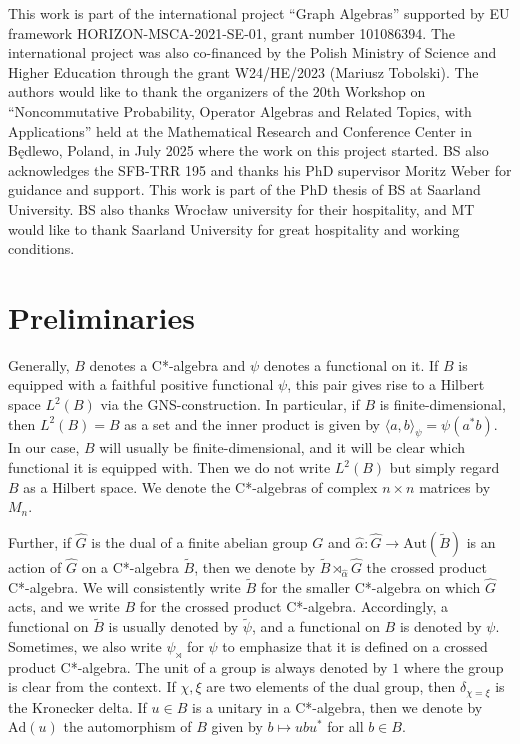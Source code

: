 \documentclass{amsart}
\newcommand{\C}{\mathbb{C}}
\theoremstyle{definition}
\theoremstyle{definition}
\begin{document}
This work is part of the international project ``Graph Algebras'' supported by EU framework HORIZON-MSCA-2021-SE-01, grant number 101086394. The international project was also co-financed by the Polish Ministry of Science and Higher Education through the grant W24/HE/2023 (Mariusz Tobolski).
The authors would like to thank the organizers of  the 20th Workshop on ``Noncommutative Probability, Operator Algebras and Related Topics, with Applications'' held at the Mathematical Research and Conference Center in B\k{e}dlewo, Poland, in July 2025 where the work on this project started. BS also acknowledges the SFB-TRR 195 and thanks his PhD supervisor Moritz Weber for guidance and support. This work is part of the PhD thesis of BS at Saarland University. BS also thanks Wroc\l aw university for their hospitality, and MT would like to thank Saarland University for great hospitality and working conditions.

\section{Preliminaries}
\label{sec::preliminaries}

Generally, $B$ denotes a C*-algebra and $\psi$ denotes a functional on it. If $B$ is equipped with a faithful positive functional $\psi$, this pair gives rise to a Hilbert space $L^2(B)$ via the GNS-construction. In particular, if $B$ is finite-dimensional, then $L^2(B) = B$ as a set and the inner product is given by $\langle a, b \rangle_\psi = \psi(a^\ast b)$. In our case, $B$ will usually be finite-dimensional, and it will be clear which functional it is equipped with. Then we do not write $L^2(B)$ but simply regard $B$ as a Hilbert space. We denote the C*-algebras of complex $n \times n$ matrices by $M_n$.

Further, if $\hat{G}$ is the dual of a finite abelian group $G$ and $\hat{\alpha}: \hat{G} \to \mathrm{Aut}(\tilde{B})$ is an action of $\hat{G}$ on a C*-algebra $\tilde{B}$, then we denote by $\tilde{B} \rtimes_{\hat{\alpha}} \hat{G}$ the crossed product C*-algebra. We will consistently write $\tilde{B}$ for the smaller C*-algebra on which $\hat{G}$ acts, and we write $B$ for the crossed product C*-algebra. Accordingly, a functional on $\tilde{B}$ is usually denoted by $\tilde{\psi}$, and a functional on $B$ is denoted by $\psi$. Sometimes, we also write $\psi_\rtimes$ for $\psi$ to emphasize that it is defined on a crossed product C*-algebra. The unit of a group is always denoted by $1$ where the group is clear from the context. If $\chi, \xi$ are two elements of the dual group, then $\delta_{\chi=\xi}$ is the Kronecker delta.
If $u \in B$ is a unitary in a C*-algebra, then we denote by $\mathrm{Ad}(u)$ the automorphism of $B$ given by $b \mapsto u b u^\ast$ for all $b \in B$.
\end{document}
